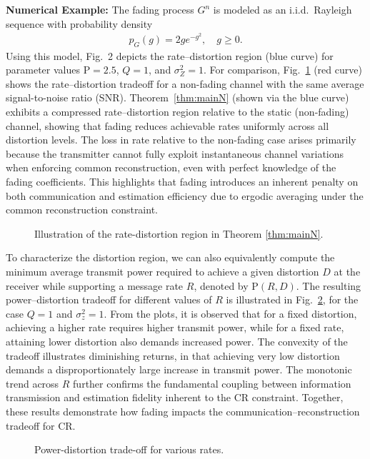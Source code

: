 \documentclass[journal]{IEEEtran}
\begin{document}
\noindent \textbf{Numerical Example:} The fading process $G^n$ is modeled as an i.i.d.\ Rayleigh sequence with probability density
\begin{align*}
p_{G}(g) = 2g e^{-g^2}, \quad g \ge 0.
\end{align*}
Using this model, Fig.~2 depicts the rate–distortion region (blue curve) for parameter values $\mathrm{P}=2.5$, $Q=1$, and $\sigma_Z^2=1$.
For comparison, Fig.~\ref{fig:rd} (red curve) shows the rate–distortion tradeoff for a non-fading channel with the same average signal-to-noise ratio (SNR). %
Theorem~\ref{thm:mainN} (shown via the blue curve) exhibits a compressed rate–distortion region relative to the static (non-fading) channel, showing that fading reduces achievable rates uniformly across all distortion levels. The loss in rate relative to the non-fading case arises primarily because the transmitter cannot fully exploit instantaneous channel variations when enforcing common reconstruction, even with perfect knowledge of the fading coefficients. 
This highlights that fading introduces an inherent penalty on both communication and estimation efficiency due to ergodic averaging under the common reconstruction constraint.
\begin{figure}[]
\begin{center}
\vspace{-6mm}
\scalebox{1.0}{}
\end{center}
\caption{Illustration of the rate-distortion region in Theorem \ref{thm:mainN}. \label{fig:rd}}
\end{figure}

To characterize the distortion region, we can also equivalently compute the minimum average transmit power required to achieve a given distortion $D$ at the receiver while supporting a message rate $R$, denoted by $\mathrm{P}(R,D)$. The resulting power–distortion tradeoff for different values of $R$ is illustrated in Fig.~\ref{fig:rd1}, for the case $Q=1$ and $\sigma_z^2=1$. From the plots, it is observed that for a fixed distortion, achieving a higher rate requires higher transmit power, while for a fixed rate, attaining lower distortion also demands increased power. The convexity of the tradeoff illustrates diminishing returns, in that achieving very low distortion demands a disproportionately large increase in transmit power. The monotonic trend across $R$ further confirms the fundamental coupling between information transmission and estimation fidelity inherent to the CR constraint. Together, these results demonstrate how fading impacts the communication–reconstruction tradeoff for CR.
\begin{figure}[]
\begin{center}
\vspace{-6mm}
\scalebox{1.0}{}
\end{center}
\caption{Power-distortion trade-off for various rates. \label{fig:rd1}}
\end{figure}
\end{document}
